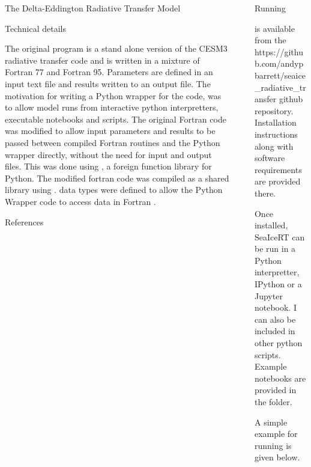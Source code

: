\documentclass[final]{beamer}
\newlength{\sepwidth}
\newlength{\colwidth}
\newcommand{\separatorcolumn}{\begin{column}{\sepwidth}\end{column}}
\begin{document}
\begin{frame}[t,fragile]
\begin{columns}[t]
\begin{column}{\colwidth}
\begin{block}{The Delta-Eddington Radiative Transfer Model}
  \end{block}

  \begin{exampleblock}{Technical details}

    The original program  is a stand alone version of
    the CESM3 radiative transfer code and is written in a mixture of
    Fortran 77 and Fortran 95.  Parameters are defined in an input
    text file and results written to an output file.  The motivation
    for writing a Python wrapper for the code, was to allow model runs
    from interactive python interpretters, executable notebooks and
    scripts.  The original Fortran code was modified to allow input
    parameters and results to be passed between compiled Fortran
    routines and the Python wrapper directly, without the need for
    input and output files.  This was done using , a
    foreign function library for Python.  The modified fortran code
    was compiled as a shared library using .
     data types were defined to allow the Python Wrapper
    code to access data in Fortran .
   
  \end{exampleblock}

  \begin{block}{References}

    \nocite{*}
    \footnotesize{}

  \end{block}

\end{column}

\separatorcolumn

\begin{column}{\colwidth}

  \begin{exampleblock}{Running }

     is available from the https://github.com/andypbarrett/seaice\_radiative\_transfer github repository.
    Installation instructions along with software requirements are provided there.

    Once installed, SeaIceRT can be run in a Python interpretter, IPython or
    a Jupyter notebook.  I can also be included in other python scripts.  Example
    notebooks are provided in the  folder.

    A simple  example for running  is given below.
    

\end{exampleblock}
\end{column}
\end{columns}
\end{frame}
\end{document}
